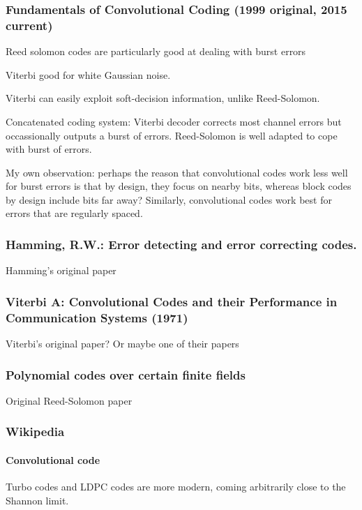 \documentclass{article}
\begin{document}
\subsubsection{Fundamentals of Convolutional Coding (1999 original, 2015 current)}

Reed solomon codes are particularly good at dealing with burst errors

Viterbi good for white Gaussian noise.

Viterbi can easily exploit soft-decision information, unlike Reed-Solomon.

Concatenated coding system: Viterbi decoder corrects most channel errors but occassionally outputs a burst of errors. Reed-Solomon is well adapted to cope with burst of errors.

My own observation: perhaps the reason that convolutional codes work less well for burst errors is that by design, they focus on nearby bits, whereas block codes by design include bits far away? Similarly, convolutional codes work best for errors that are regularly spaced.

\subsubsection{Hamming, R.W.: Error detecting and error correcting codes.}

Hamming's original paper

\subsubsection{Viterbi A: Convolutional Codes and their Performance in
Communication Systems (1971)}

Viterbi's original paper? Or maybe one of their papers

\subsubsection{Polynomial codes over certain finite fields}

Original Reed-Solomon paper

\subsubsection{Wikipedia}

\paragraph{Convolutional code} Turbo codes and LDPC codes are more modern, coming arbitrarily close to the Shannon limit.
\end{document}
